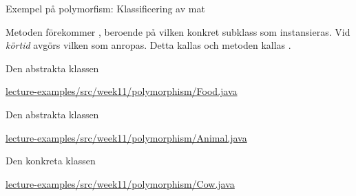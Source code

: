 \documentclass{lecturenotes}
\begin{document}
\begin{Slide}{Exempel på polymorfism: Klassificering av mat}
\begin{center}
\end{center}
Metoden  förekommer , beroende på vilken konkret subklass som instansieras. Vid \emph{körtid} avgörs vilken som anropas. Detta kallas  och metoden  kallas .
\end{Slide}

\begin{Slide}{Den abstrakta klassen }

\href{https://github.com/bjornregnell/lth-eda016-2015/blob/master/lectures/examples/eclipse-ws/lecture-examples/src/week11/polymorphism/Food.java}{lecture-examples/src/week11/polymorphism/Food.java}
\end{Slide}

\begin{Slide}{Den abstrakta klassen }

\href{https://github.com/bjornregnell/lth-eda016-2015/blob/master/lectures/examples/eclipse-ws/lecture-examples/src/week11/polymorphism/Food.java}{lecture-examples/src/week11/polymorphism/Animal.java}
\end{Slide}

\begin{Slide}{Den konkreta klassen }

\href{https://github.com/bjornregnell/lth-eda016-2015/blob/master/lectures/examples/eclipse-ws/lecture-examples/src/week11/polymorphism/Food.java}{lecture-examples/src/week11/polymorphism/Cow.java}
\end{Slide}
\end{document}
